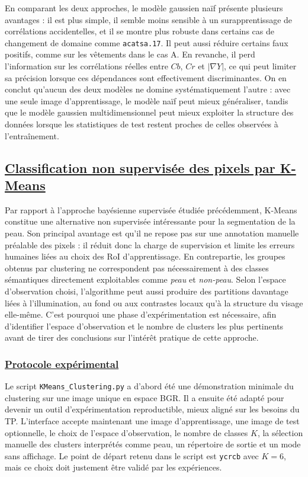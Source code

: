 En comparant les deux approches, le mod\`ele gaussien na\"if pr\'esente plusieurs avantages : il est plus simple, il semble moins sensible \`a un surapprentissage de corr\'elations accidentelles, et il se montre plus robuste dans certains cas de changement de domaine comme \texttt{acatsa.17}. Il peut aussi r\'eduire certains faux positifs, comme sur les v\^etements dans le cas A. En revanche, il perd l'information sur les corr\'elations r\'eelles entre \(Cb\), \(Cr\) et \(|\nabla Y|\), ce qui peut limiter sa pr\'ecision lorsque ces d\'ependances sont effectivement discriminantes. On en conclut qu'aucun des deux mod\`eles ne domine syst\'ematiquement l'autre : avec une seule image d'apprentissage, le mod\`ele na\"if peut mieux g\'en\'eraliser, tandis que le mod\`ele gaussien multidimensionnel peut mieux exploiter la structure des donn\'ees lorsque les statistiques de test restent proches de celles observ\'ees \`a l'entra\^inement.

\subsection{\underline{\textbf{Classification non supervisée des pixels par K-Means}}}

Par rapport \`a l'approche bay\'esienne supervis\'ee \'etudi\'ee pr\'ec\'edemment, K-Means constitue une alternative non supervis\'ee int\'eressante pour la segmentation de la peau. Son principal avantage est qu'il ne repose pas sur une annotation manuelle pr\'ealable des pixels : il r\'eduit donc la charge de supervision et limite les erreurs humaines li\'ees au choix des RoI d'apprentissage. En contrepartie, les groupes obtenus par clustering ne correspondent pas n\'ecessairement \`a des classes s\'emantiques directement exploitables comme \textit{peau} et \textit{non-peau}. Selon l'espace d'observation choisi, l'algorithme peut aussi produire des partitions davantage li\'ees \`a l'illumination, au fond ou aux contrastes locaux qu'\`a la structure du visage elle-m\^eme. C'est pourquoi une phase d'exp\'erimentation est n\'ecessaire, afin d'identifier l'espace d'observation et le nombre de clusters les plus pertinents avant de tirer des conclusions sur l'int\'er\^et pratique de cette approche.

\subsubsection{\underline{\textbf{Protocole expérimental}}}

Le script \texttt{KMeans\_Clustering.py} a d'abord \'et\'e une d\'emonstration minimale du clustering sur une image unique en espace BGR. Il a ensuite \'et\'e adapt\'e pour devenir un outil d'exp\'erimentation reproductible, mieux align\'e sur les besoins du TP. L'interface accepte maintenant une image d'apprentissage, une image de test optionnelle, le choix de l'espace d'observation, le nombre de classes \(K\), la s\'election manuelle des clusters interpr\'et\'es comme peau, un r\'epertoire de sortie et un mode sans affichage. Le point de d\'epart retenu dans le script est \texttt{ycrcb} avec \(K=6\), mais ce choix doit justement \^etre valid\'e par les exp\'eriences.

